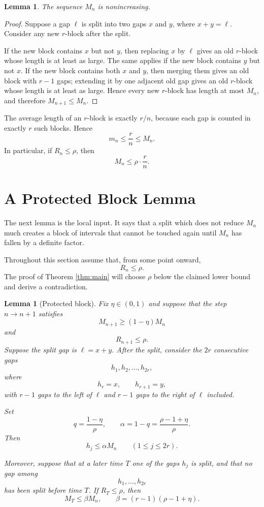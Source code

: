 \documentclass[11pt]{article}
\newtheorem{lemma}[theorem]{Lemma}
\theoremstyle{remark}
\begin{document}
\begin{lemma}\label{lem:M-monotone}
The sequence $M_n$ is nonincreasing.
\end{lemma}

\begin{proof}
Suppose a gap $\ell$ is split into two gaps $x$ and $y$, where $x+y=\ell$. Consider any new $r$-block after the split.

\bigskip
\noindent
If the new block contains $x$ but not $y$, then replacing $x$ by $\ell$ gives an old $r$-block whose length is at least as large. The same applies if the new block contains $y$ but not $x$. If the new block contains both $x$ and $y$, then merging them gives an old block with $r-1$ gaps; extending it by one adjacent old gap gives an old $r$-block whose length is at least as large. Hence every new $r$-block has length at most $M_n$, and therefore $M_{n+1}\leq M_n$.
\end{proof}

\smallskip
\noindent
The average length of an $r$-block is exactly $r/n$, because each gap is counted in exactly $r$ such blocks. Hence
\[
    m_n\leq \frac rn\leq M_n.
\]
In particular, if $R_n\leq \rho$, then
\[
    M_n\leq \rho\cdot\frac rn .        \tag{2.1}\label{eq:M-upper-under-ratio}
\]

\section{A Protected Block Lemma}

The next lemma is the local input. It says that a split which does not reduce $M_n$ much creates a block of intervals that cannot be touched again until $M_n$ has fallen by a definite factor.

\bigskip
\noindent
Throughout this section assume that, from some point onward,
\[
    R_n\leq \rho .
\]
The proof of Theorem \ref{thm:main} will choose $\rho$ below the claimed lower bound and derive a contradiction.

\begin{lemma}[Protected block]\label{lem:protected-block}
Fix $\eta\in(0,1)$ and suppose that the step $n\to n+1$ satisfies
\[
    M_{n+1}\geq (1-\eta)M_n
\]
and
\[
    R_{n+1}\leq \rho.
\]
Suppose the split gap is $\ell=x+y$. After the split, consider the $2r$ consecutive gaps
\[
    h_1,h_2,\ldots,h_{2r},
\]
where
\[
    h_r=x,\qquad h_{r+1}=y,
\]
with $r-1$ gaps to the left of $\ell$ and $r-1$ gaps to the right of $\ell$ included.

\bigskip
\noindent
Set
\[
    q=\frac{1-\eta}{\rho},
    \qquad
    \alpha=1-q=\frac{\rho-1+\eta}{\rho}.
\]
Then
\[
    h_j\leq \alpha M_n
    \qquad (1\leq j\leq 2r).      \tag{3.1}\label{eq:gap-bound}
\]

\smallskip
\noindent
Moreover, suppose that at a later time $T$ one of the gaps $h_j$ is split, and that no gap among
\[
    h_1,\ldots,h_{2r}
\]
has been split before time $T$. If $R_T\leq \rho$, then
\[
    M_T\leq \beta M_n,
    \qquad
    \beta=(r-1)(\rho-1+\eta).       \tag{3.2}\label{eq:release-factor}
\]
\end{lemma}
\end{document}
